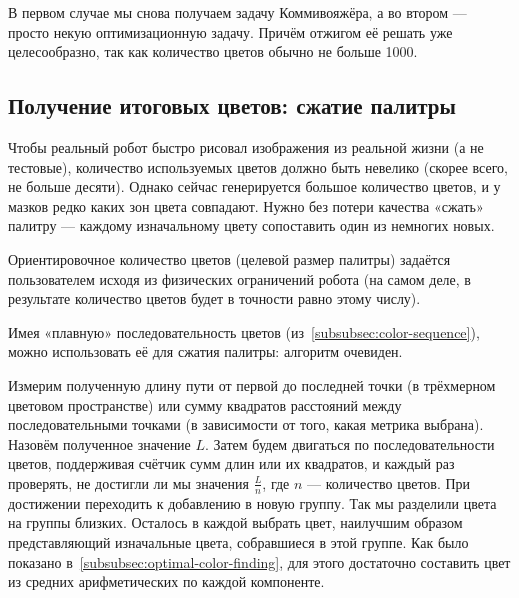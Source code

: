В первом случае мы снова получаем задачу Коммивояжёра, а во втором — просто некую оптимизационную задачу.
Причём отжигом её решать уже целесообразно, так как количество цветов обычно не больше 1000.


\subsection{Получение итоговых цветов: сжатие палитры}\label{subsec:getting-final-colors}
Чтобы реальный робот быстро рисовал изображения из реальной жизни (а не тестовые),
количество используемых цветов должно быть невелико (скорее всего, не больше десяти).
Однако сейчас генерируется большое количество цветов, и у мазков редко каких зон цвета совпадают.
Нужно без потери качества «сжать» палитру — каждому изначальному цвету сопоставить один из немногих новых.

Ориентировочное количество цветов (целевой размер палитры) задаётся пользователем исходя из физических ограничений робота
(на самом деле, в результате количество цветов будет в точности равно этому числу).

Имея «плавную» последовательность цветов (из~\ref{subsubsec:color-sequence}),
можно использовать её для сжатия палитры: алгоритм очевиден.

Измерим полученную длину пути от первой до последней точки (в трёхмерном цветовом пространстве)
или сумму квадратов расстояний между последовательными точками (в зависимости от того, какая метрика выбрана).
Назовём полученное значение $L$.
Затем будем двигаться по последовательности цветов, поддерживая счётчик сумм длин или их квадратов,
и каждый раз проверять, не достигли ли мы значения $\frac{L}{n}$, где $n$ — количество цветов.
При достижении переходить к добавлению в новую группу.
Так мы разделили цвета на группы близких.
Осталось в каждой выбрать цвет, наилучшим образом представляющий изначальные цвета, собравшиеся в этой группе.
Как было показано в~\ref{subsubsec:optimal-color-finding}, для этого достаточно составить цвет из средних арифметических по каждой компоненте.